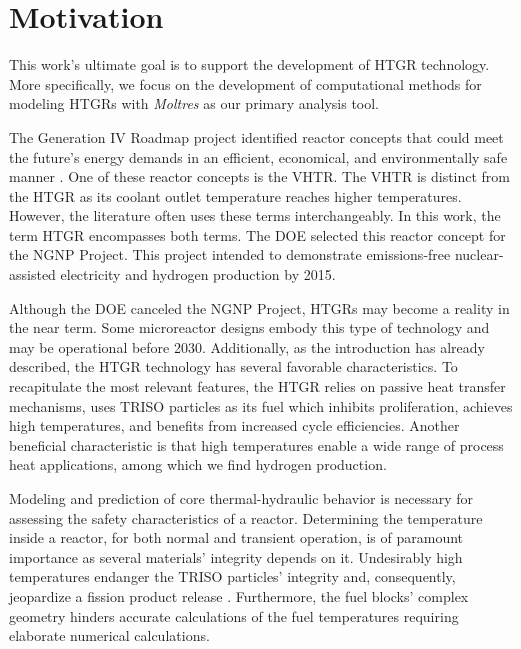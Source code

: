 \section{Motivation}

This work's ultimate goal is to support the development of \gls{HTGR} technology.
More specifically, we focus on the development of computational methods for modeling \glspl{HTGR} with \textit{Moltres} as our primary analysis tool.

The Generation IV Roadmap project identified reactor concepts that could meet the future's energy demands in an efficient, economical, and environmentally safe manner \cite{macdonald_ngnp_2003}.
One of these reactor concepts is the \gls{VHTR}.
The \gls{VHTR} is distinct from the \gls{HTGR} as its coolant outlet temperature reaches higher temperatures.
However, the literature often uses these terms interchangeably.
In this work, the term \gls{HTGR} encompasses both terms.
The \gls{DOE} selected this reactor concept for the \gls{NGNP} Project.
This project intended to demonstrate emissions-free nuclear-assisted electricity and hydrogen production by 2015.

Although the \gls{DOE} canceled the \gls{NGNP} Project, \glspl{HTGR} may become a reality in the near term.
Some microreactor designs embody this type of technology and may be operational before 2030.
Additionally, as the introduction has already described, the \gls{HTGR} technology has several favorable characteristics.
To recapitulate the most relevant features, the \gls{HTGR} relies on passive heat transfer mechanisms, uses TRISO particles as its fuel which inhibits proliferation, achieves high temperatures, and benefits from increased cycle efficiencies.
Another beneficial characteristic is that high temperatures enable a wide range of process heat applications, among which we find hydrogen production.

Modeling and prediction of core thermal-hydraulic behavior is necessary for assessing the safety characteristics of a reactor.
Determining the temperature inside a reactor, for both normal and transient operation, is of paramount importance as several materials' integrity depends on it.
Undesirably high temperatures endanger the TRISO particles' integrity and, consequently, jeopardize a fission product release \cite{tak_numerical_2008}.
Furthermore, the fuel blocks' complex geometry hinders accurate calculations of the fuel temperatures requiring elaborate numerical calculations.

